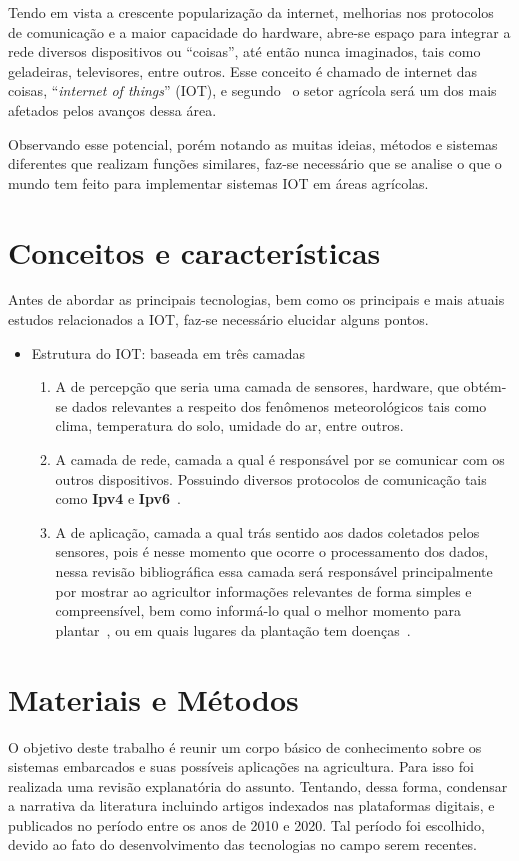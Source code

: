 \documentclass[
article,			%
12pt,				%
oneside,			%
a4paper,			%
english,			%
brazil,				%
sumario=tradicional
]{abntex2}
\begin{document}
Tendo em vista a crescente popularização da internet, melhorias nos protocolos de comunicação e a maior capacidade do hardware, abre-se espaço para integrar a rede diversos dispositivos ou ``coisas'', até então nunca imaginados, tais como geladeiras, televisores, entre outros. Esse conceito é chamado de internet das coisas, ``\textit{internet of things}'' (IOT), e segundo~\citeauthor{5} o setor agrícola será um dos mais afetados pelos avanços dessa área.

Observando esse potencial, porém notando as muitas ideias, métodos e sistemas diferentes que realizam funções similares, faz-se necessário que se analise o que o mundo tem feito para implementar sistemas IOT em áreas agrícolas.

\section{Conceitos e características}\label{Conceitos Importantes}
Antes de abordar as principais tecnologias, bem como os principais e mais atuais estudos relacionados a IOT, faz-se necessário elucidar alguns pontos.
\begin{itemize}
  \item Estrutura do IOT: baseada em três camadas~\cite{5}

    \begin{enumerate}
      \item A de percepção que seria uma camada de sensores, hardware, que obtém-se dados relevantes a respeito dos fenômenos meteorológicos tais como clima, temperatura do solo, umidade do ar, entre outros.
      \item A camada de rede, camada a qual é responsável por se comunicar com os outros dispositivos. Possuindo diversos protocolos de comunicação tais como \textbf{Ipv4} e \textbf{Ipv6}~\cite{camada2}.
      \item A de aplicação, camada a qual trás sentido aos dados coletados pelos sensores, pois é nesse momento que ocorre o processamento dos dados, nessa revisão bibliográfica essa camada será responsável principalmente por mostrar ao agricultor informações relevantes de forma simples e compreensível, bem como informá-lo qual o melhor momento para plantar~\cite{1}, ou em quais lugares da plantação tem doenças~\cite{2}.
    \end{enumerate}
\end{itemize}

\section{Materiais e Métodos}\label{Material e Método}
O objetivo deste trabalho é reunir um corpo básico de conhecimento sobre os sistemas embarcados e suas possíveis aplicações na agricultura. Para isso foi realizada uma revisão explanatória do assunto. Tentando, dessa forma, condensar a narrativa da literatura incluindo artigos indexados nas plataformas digitais, e publicados no período entre os anos de 2010 e 2020. Tal período foi escolhido, devido ao fato do desenvolvimento das tecnologias no campo serem recentes. 
\end{document}
